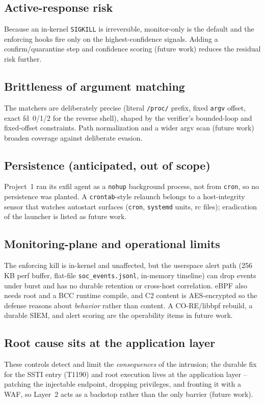 \documentclass[11pt]{article}
\newcommand{\co}[1]{\texttt{#1}}
\begin{document}
\subsection{Active-response risk}
\label{sec:ar-limits}
Because an in-kernel \co{SIGKILL} is irreversible, monitor-only is the
default and the enforcing hooks fire only on the highest-confidence signals.
Adding a confirm/quarantine step and confidence scoring (future work) reduces
the residual risk further.

\subsection{Brittleness of argument matching}
\label{sec:brittle-limits}
The matchers are deliberately precise (literal \co{/proc/} prefix, fixed
\co{argv} offset, exact fd~0/1/2 for the reverse shell), shaped by the
verifier's bounded-loop and fixed-offset constraints. Path normalization and
a wider argv scan (future work) broaden coverage against deliberate evasion.

\subsection{Persistence (anticipated, out of scope)}
\label{sec:persist-limits}
Project~1 ran its exfil agent as a \co{nohup} background process, not from
\co{cron}, so no persistence was planted. A \co{crontab}-style relaunch
belongs to a host-integrity sensor that watches autostart surfaces
(\co{cron}, \co{systemd} units, rc files); eradication of the launcher is
listed as future work.

\subsection{Monitoring-plane and operational limits}
\label{sec:misc-limits}
The enforcing kill is in-kernel and unaffected, but the userspace alert path
(256\,KB perf buffer, flat-file \co{soc\_events.jsonl}, in-memory timeline)
can drop events under burst and has no durable retention or cross-host
correlation. eBPF also needs root and a BCC runtime compile, and C2 content
is AES-encrypted so the defense reasons about \emph{behavior} rather than
content. A CO-RE/libbpf rebuild, a durable SIEM, and alert scoring are the
operability items in future work.

\subsection{Root cause sits at the application layer}
\label{sec:rootcause}
These controls detect and limit the \emph{consequences} of the intrusion;
the durable fix for the SSTI entry (T1190) and root execution lives at the
application layer -- patching the injectable endpoint, dropping privileges,
and fronting it with a WAF, so Layer~2 acts as a backstop rather than the
only barrier (future work).
\end{document}
